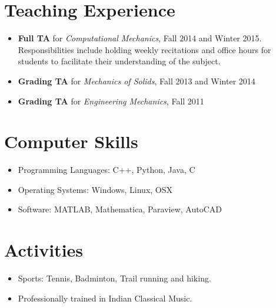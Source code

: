 \documentclass[10pt,fleqn]{article}
\begin{document}
\section*{Teaching Experience}
\begin{itemize}
\item \textbf{Full TA} for \emph{Computational Mechanics}, Fall 2014 and Winter 2015.\\
Responsibilities include holding weekly recitations and office hours for students to facilitate their understanding of the subject.
\item \textbf{Grading TA} for \emph{Mechanics of Solids}, Fall 2013 and Winter 2014
\item \textbf{Grading TA} for \emph{Engineering Mechanics}, Fall 2011
\end{itemize}
\section*{Computer Skills}
\begin{itemize}
\setlength{\itemsep}{0pt}
\item Programming Languages: C++, Python, Java, C
\item Operating Systems: Windows, Linux, OSX
\item Software: MATLAB, Mathematica, Paraview, AutoCAD
\end{itemize}

\section*{Activities}
\begin{itemize}
\setlength{\itemsep}{0pt}
\item Sports: Tennis, Badminton, Trail running and hiking.
\item Professionally trained in Indian Classical Music.
\end{itemize}
\end{document}
